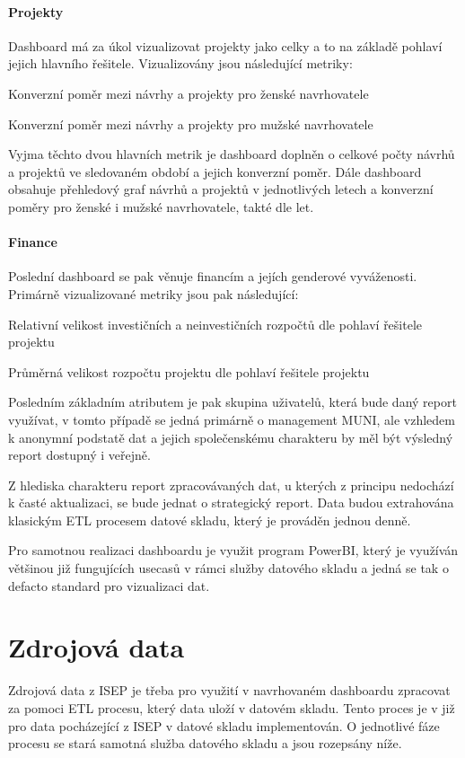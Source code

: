 \documentclass[
  digital,     %
  twoside,     %
  lof,         %
  lot,         %
]{fithesis4}
\begin{document}
\paragraph{Projekty} Dashboard má za úkol vizualizovat projekty jako celky a to na základě pohlaví jejich hlavního řešitele. Vizualizovány jsou následující metriky:
\begin{compactitem}
    \item Konverzní poměr mezi návrhy a projekty pro ženské navrhovatele
    \item Konverzní poměr mezi návrhy a projekty pro mužské navrhovatele
\end{compactitem}
Vyjma těchto dvou hlavních metrik je dashboard doplněn o celkové počty návrhů a projektů ve sledovaném období a jejich konverzní poměr. Dále dashboard obsahuje přehledový graf návrhů a projektů v jednotlivých letech a konverzní poměry pro ženské i mužské navrhovatele, takté dle let.

\paragraph{Finance} Poslední dashboard se pak věnuje financím a jejích genderové vyváženosti. Primárně vizualizované metriky jsou pak následující:
\begin{compactitem}
    \item Relativní velikost investičních a neinvestičních rozpočtů dle pohlaví řešitele projektu
    \item Průměrná velikost rozpočtu projektu dle pohlaví řešitele projektu
\end{compactitem}
\vspace{5}

Posledním základním atributem je pak skupina uživatelů, která bude daný report využívat, v tomto případě se jedná primárně o management MUNI, ale vzhledem k anonymní podstatě dat a jejich společenskému charakteru by měl být výsledný report dostupný i veřejně. 

Z hlediska charakteru report zpracovávaných dat, u kterých z principu nedochází k časté aktualizaci, se bude jednat o strategický report. Data budou extrahována klasickým ETL procesem datové skladu, který je prováděn jednou denně. 

Pro samotnou realizaci dashboardu je využit program PowerBI, který je využíván většinou již fungujících usecasů v rámci služby datového skladu a jedná se tak o defacto standard pro vizualizaci dat.

\section{Zdrojová data}
Zdrojová data z ISEP je třeba pro využití v navrhovaném dashboardu zpracovat za pomoci ETL procesu, který data uloží v datovém skladu. Tento proces je v již pro data pocházející z ISEP v datové skladu implementován. O jednotlivé fáze procesu se stará samotná služba datového skladu a jsou rozepsány níže. 
\end{document}
